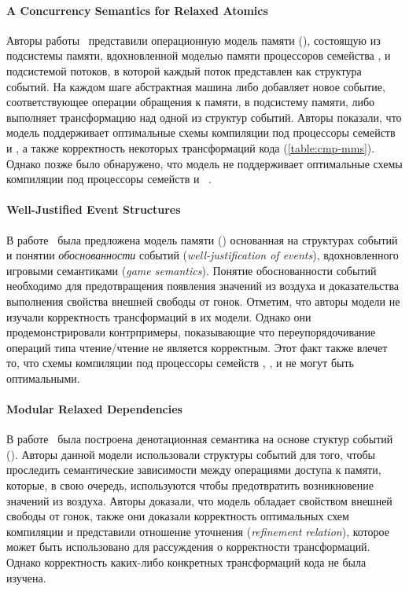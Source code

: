 \paragraph{A Concurrency Semantics for Relaxed Atomics}

Авторы работы~\cite{PichonPharabod-Sewell:POPL16} 
представили операционную модель памяти (\CSRA),
состоящую из подсистемы памяти, вдохновленной моделью памяти 
процессоров семейства \POWER, 
и подсистемой потоков, в которой каждый поток 
представлен как структура событий. 
На каждом шаге абстрактная машина либо 
добавляет новое событие, соответствующее операции обращения к памяти, 
в подсистему памяти, либо выполняет трансформацию 
над одной из структур событий. 
Авторы показали, что модель поддерживает оптимальные 
схемы компиляции под процессоры семейств \Intel и \POWER,
а также корректность некоторых трансформаций кода
(\see \cref{table:cmp-mms}). 
Однако позже было обнаружено, что 
модель не поддерживает оптимальные схемы компиляции
под процессоры семейств  и ~\cite{PichonPharabod:PhD18}.

\paragraph{Well-Justified Event Structures}

В работе~\cite{Jeffrey-Riely:LICS16} была предложена модель памяти (\WJES)
основанная на структурах событий и понятии 
\emph{обоснованности} событий (\emph{well-justification of events}), 
вдохновленного игровыми семантиками (\emph{game semantics}).
Понятие обоснованности событий необходимо для 
предотвращения появления значений из воздуха и 
доказательства выполнения свойства внешней свободы от гонок. 
Отметим, что авторы модели не изучали корректность трансформаций 
в их модели. Однако они продемонстрировали контрпримеры, 
показывающие что переупорядочивание операций типа чтение/чтение 
не является корректным. 
Этот факт также влечет то, что схемы компиляции 
под процессоры семейств , , и \POWER 
не могут быть оптимальными. 

\paragraph{Modular Relaxed Dependencies}

В работе~\cite{Paviotti-al:ESOP20} была построена 
денотационная семантика на основе стуктур событий (\MRD). 
Авторы данной модели использовали структуры событий 
для того, чтобы проследить семантические зависимости
между операциями доступа к памяти, 
которые, в свою очередь, используются 
чтобы предотвратить возникновение значений из воздуха. 
Авторы доказали, что модель обладает свойством внешней свободы от гонок,
также они доказали корректность оптимальных схем компиляции
и представили отношение уточнения (\emph{refinement relation}), 
которое может быть использовано для рассуждения о корректности трансформаций. 
Однако корректность каких-либо конкретных трансформаций кода не была изучена.

